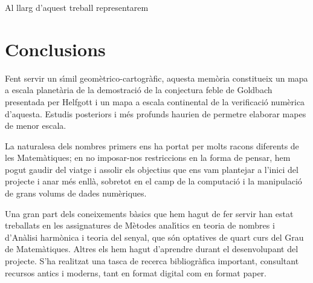 \documentclass[11pt,a4paper,openright,oneside]{article}
\numberwithin{equation}{section}
\theoremstyle{definition}
\begin{document}
Al llarg d'aquest treball representarem 

\newpage

\section{Conclusions}

Fent servir un s\'{\i}mil geom\`etrico-cartogr\`afic, aquesta mem\`oria constitueix un mapa a escala planet\`aria de la demostraci\'o de la conjectura feble de Goldbach presentada per Helfgott i un mapa a escala continental de la verificaci\'o num\`erica d'aquesta. Estudis posteriors i m\'es profunds haurien de permetre elaborar mapes de menor escala.

La naturalesa dels nombres primers ens ha portat per molts racons diferents de les Matem\`atiques; en no imposar-nos restriccions en la forma de pensar, hem pogut gaudir del viatge i assolir els objectius que ens vam plantejar a l'inici del projecte i anar m\'es enll\`a, sobretot en el camp de la computaci\'o i la manipulaci\'o de grans volums de dades num\`eriques.

Una gran part dels coneixements b\`asics que hem hagut de fer servir han estat treballats en les assignatures de M\`etodes anal\'{\i}tics en teoria de nombres i d'An\`alisi harm\`onica i teoria del senyal, que s\'on optatives de quart curs del Grau de Ma\-te\-m\`a\-ti\-ques. Altres els hem hagut d'aprendre durant el desenvolupant del projecte. S'ha realitzat una tasca de recerca bibliogr\`afica important, consultant recursos antics i moderns, tant en format digital com en format paper.

\normalfont

\newpage
\end{document}
